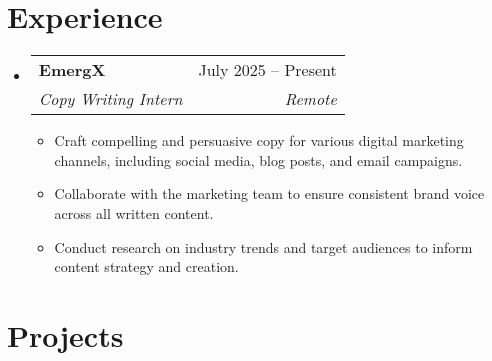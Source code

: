 \documentclass[letterpaper,11pt]{article}
\makeatletter
\newcommand{\resumeItem}[1]{
  \item\small{
    {#1 \vspace{-2pt}}
  }
}
\newcommand{\resumeSubheading}[4]{
  \vspace{-2pt}\item
    \begin{tabular*}{0.97\textwidth}[t]{l@{\extracolsep{\fill}}r}
      \textbf{#1} & #2 \\
      \textit{\small#3} & \textit{\small #4} \\
    \end{tabular*}\vspace{-7pt}
}
\newcommand{\resumeProjectHeading}[2]{
    \item
    \begin{tabular*}{0.97\textwidth}{l@{\extracolsep{\fill}}r}
      \small#1 & #2 \\
    \end{tabular*}\vspace{-7pt}
}
\newcommand{\resumeSubHeadingListStart}{\begin{itemize}[leftmargin=0.15in, label={}]}
\newcommand{\resumeSubHeadingListEnd}{\end{itemize}}
\newcommand{\resumeItemListStart}{\begin{itemize}}
\newcommand{\resumeItemListEnd}{\end{itemize}\vspace{-5pt}}
\makeatother
\begin{document}
\section{Experience}
  \resumeSubHeadingListStart
    \resumeSubheading
      {EmergX}{July 2025 -- Present}
{Copy Writing Intern}{Remote}
      \resumeItemListStart
        \resumeItem{Craft compelling and persuasive copy for various digital marketing channels, including social media, blog posts, and email campaigns.}
        \resumeItem{ Collaborate with the marketing team to ensure consistent brand voice across all written content.}
        \resumeItem{Conduct research on industry trends and target audiences to inform content strategy and creation.}
      \resumeItemListEnd
 \resumeSubHeadingListEnd
 \vspace{-16pt}


\section{Projects}





\end{document}
